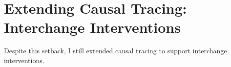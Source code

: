 \documentclass{article}
\begin{document}
\section{Extending Causal Tracing: Interchange Interventions}
Despite this setback, I still extended causal tracing to support interchange interventions. 


\end{document}
